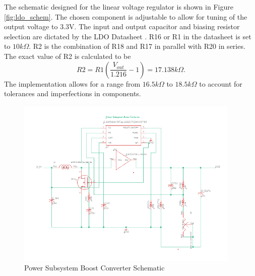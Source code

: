 \documentclass[12pt]{article}
\begin{document}
The schematic designed for the linear voltage regulator is shown in Figure \ref{fig:ldo_schem}. The chosen component is adjustable to allow for tuning of the output voltage to 3.3V. The input and output capacitor and biasing resistor selection are dictated by the LDO Datasheet \cite{ldo}. R16 or R1 in the datasheet is set to $10k\Omega$. R2 is the combination of R18 and R17 in parallel with R20 in series. The exact value of R2 is calculated to be
\[ R2 = R1(\frac{V_{out}}{1.216} - 1) = 17.138k\Omega. \]
The implementation allows for a range from $16.5k\Omega$ to $18.5k\Omega$ to account for tolerances and imperfections in components.

\begin{figure}[!h]
	\centering
	\includegraphics[width=0.95\textwidth]{boost_schem.png}
	\caption{Power Subsystem Boost Converter Schematic}
	\label{fig:boost_schem}
\end{figure}
\end{document}

